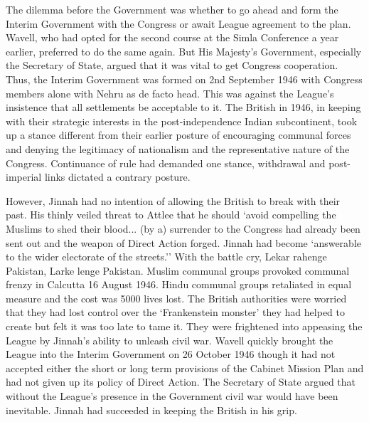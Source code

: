 The dilemma before the Government was whether to go ahead and form the Interim Government with the Congress or await League agreement to the plan. Wavell, who had opted for the second course at the Simla Conference a year earlier, preferred to do the same again. But His Majesty's Government, especially the Secretary of State, argued that it was vital to get Congress cooperation. Thus, the Interim Government was formed on 2nd September 1946 with Congress members alone with Nehru as de facto head. This was against the League's insistence that all settlements be acceptable to it. The British in 1946, in keeping with their strategic interests in the post-independence Indian subcontinent, took up a stance different from their earlier posture of encouraging communal forces and denying the legitimacy of nationalism and the representative nature of the Congress. Continuance of rule had demanded one stance, withdrawal and post-imperial links dictated a contrary posture. 

However, Jinnah had no intention of allowing the British to break with their past. His thinly veiled threat to Attlee that he should `avoid compelling the Muslims to shed their blood... (by a) surrender to the Congress had already been sent out and the weapon of Direct Action forged. Jinnah had become `answerable to the wider electorate of the streets.'' With the battle cry, Lekar rahenge Pakistan, Larke lenge Pakistan. Muslim communal groups provoked communal frenzy in Calcutta 16 August 1946. Hindu communal groups retaliated in equal measure and the cost was 5000 lives lost. The British authorities were worried that they had lost control over the `Frankenstein monster' they had helped to create but felt it was too late to tame it. They were frightened into appeasing the League by Jinnah's ability to unleash civil war. Wavell quickly brought the League into the Interim Government on 26 October 1946 though it had not accepted either the short or long term provisions of the Cabinet Mission Plan and had not given up its policy of Direct Action. The Secretary of State argued that without the League's presence in the Government civil war would have been inevitable. Jinnah had succeeded in keeping the British in his grip. 


